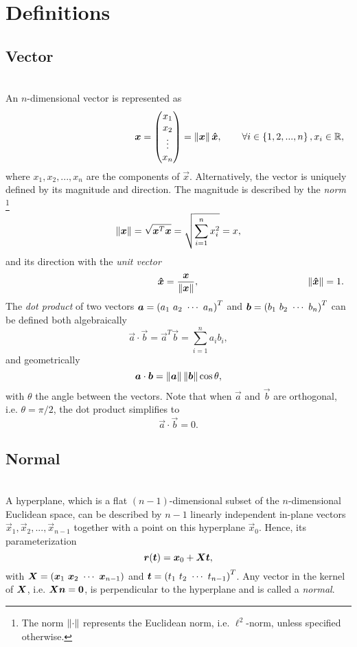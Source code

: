 \section{Definitions}
\label{app:definitions}

\subsection*{Vector}
\cite{dot_product}\\
An $n$-dimensional vector is represented as
\[
\lcr{}{
\vec{x} =
\begin{pmatrix}
x_1 \\ x_2 \\ \vdots \\ x_n
\end{pmatrix} = \norm{\vec{x}} \uvec{x},
}{
\forall i \in \set{1, 2, ..., n}, x_i \in \mathbb{R},
}
\]
where $x_1, x_2, ..., x_n$ are the components of $\vec{x}$. Alternatively, the vector is uniquely defined by its magnitude and direction. The magnitude is described by the \emph{norm}%
\footnote{The norm $\left\lVert\cdot\right\rVert$ represents the Euclidean norm, i.e. $\ell^2$-norm, unless specified otherwise.}
\[
\left\lVert\boldsymbol{x}\right\rVert = \sqrt{\boldsymbol{x}^T \boldsymbol{x}} = \sqrt{\sum_{i=1}^{n} x_i^2} = x,
\]
and its direction with the \emph{unit vector}
\[
\lcr{}{
\uvec{x} = \frac{\vec{x}}{\norm{\vec{x}}},
}{
\norm{\uvec{x}} = 1.
}
\]
The \emph{dot product} of two vectors $\vec{a} = \inlinemat{a_1, a_2, \cdots, a_n}^T$ and $\vec{b} = \inlinemat{b_1, b_2, \cdots, b_n}^T$ can be defined both algebraically
\[
\vec{a} \cdot \vec{b} = \vec{a}^T \vec{b} = \sum_{i=1}^{n} a_i b_i,
\]
and geometrically
\[
\boldsymbol{a} \cdot \boldsymbol{b} = \left\lVert\boldsymbol{a}\right\rVert \left\lVert\boldsymbol{b}\right\rVert \cos{\theta},
\]
with $\theta$ the angle between the vectors. Note that when $\vec{a}$ and $\vec{b}$ are orthogonal, i.e. $\theta = \pi/2$, the dot product simplifies to
\[
\vec{a} \cdot \vec{b} = 0.
\] 

\subsection*{Normal}
\cite{euclidean_space,hyperplane,normal}\\
A hyperplane, which is a flat $(n-1)$-dimensional subset of the $n$-dimensional Euclidean space, can be described by $n-1$ linearly independent in-plane vectors $\vec{x}_1, \vec{x}_2, ..., \vec{x}_{n-1}$ together with a point on this hyperplane $\vec{x}_0$. Hence, its parameterization
\[
\boldsymbol{r}(\boldsymbol{t}) = \boldsymbol{x}_0 + \boldsymbol{X} \boldsymbol{t},
\]
with $\mat{X} = \inlinemat{\vec{x}_1, \vec{x}_2, \cdots, \vec{x}_{n-1}}$ and $\vec{t} = \inlinemat{t_1, t_2, \cdots, t_{n-1}}^T$. Any vector in the kernel of $\boldsymbol{X}$, i.e. $\boldsymbol{X} \boldsymbol{n} = \boldsymbol{0}$, is perpendicular to the hyperplane and is called a \emph{normal}.

